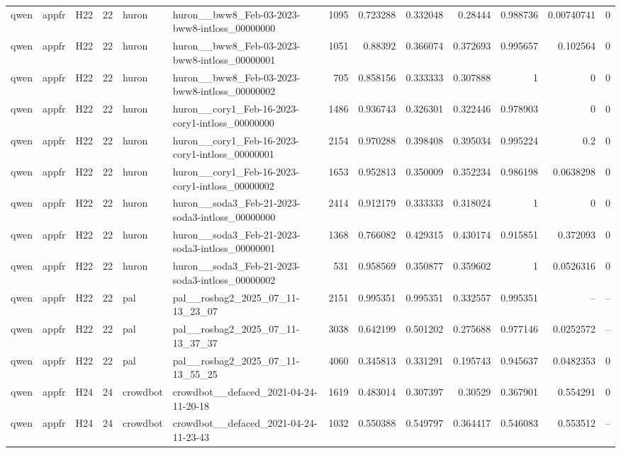 \begin{longtable}{lllrllrrrrrrr}
qwen & appfr & H22 & 22 & huron & huron\_\_bww8\_Feb-03-2023-bww8-intloss\_00000000 & 1095 & 0.723288 & 0.332048 & 0.28444 & 0.988736 & 0.00740741 & 0 \\
qwen & appfr & H22 & 22 & huron & huron\_\_bww8\_Feb-03-2023-bww8-intloss\_00000001 & 1051 & 0.88392 & 0.366074 & 0.372693 & 0.995657 & 0.102564 & 0 \\
qwen & appfr & H22 & 22 & huron & huron\_\_bww8\_Feb-03-2023-bww8-intloss\_00000002 & 705 & 0.858156 & 0.333333 & 0.307888 & 1 & 0 & 0 \\
qwen & appfr & H22 & 22 & huron & huron\_\_cory1\_Feb-16-2023-cory1-intloss\_00000000 & 1486 & 0.936743 & 0.326301 & 0.322446 & 0.978903 & 0 & 0 \\
qwen & appfr & H22 & 22 & huron & huron\_\_cory1\_Feb-16-2023-cory1-intloss\_00000001 & 2154 & 0.970288 & 0.398408 & 0.395034 & 0.995224 & 0.2 & 0 \\
qwen & appfr & H22 & 22 & huron & huron\_\_cory1\_Feb-16-2023-cory1-intloss\_00000002 & 1653 & 0.952813 & 0.350009 & 0.352234 & 0.986198 & 0.0638298 & 0 \\
qwen & appfr & H22 & 22 & huron & huron\_\_soda3\_Feb-21-2023-soda3-intloss\_00000000 & 2414 & 0.912179 & 0.333333 & 0.318024 & 1 & 0 & 0 \\
qwen & appfr & H22 & 22 & huron & huron\_\_soda3\_Feb-21-2023-soda3-intloss\_00000001 & 1368 & 0.766082 & 0.429315 & 0.430174 & 0.915851 & 0.372093 & 0 \\
qwen & appfr & H22 & 22 & huron & huron\_\_soda3\_Feb-21-2023-soda3-intloss\_00000002 & 531 & 0.958569 & 0.350877 & 0.359602 & 1 & 0.0526316 & 0 \\
qwen & appfr & H22 & 22 & pal & pal\_\_rosbag2\_2025\_07\_11-13\_23\_07 & 2151 & 0.995351 & 0.995351 & 0.332557 & 0.995351 & -- & -- \\
qwen & appfr & H22 & 22 & pal & pal\_\_rosbag2\_2025\_07\_11-13\_37\_37 & 3038 & 0.642199 & 0.501202 & 0.275688 & 0.977146 & 0.0252572 & -- \\
qwen & appfr & H22 & 22 & pal & pal\_\_rosbag2\_2025\_07\_11-13\_55\_25 & 4060 & 0.345813 & 0.331291 & 0.195743 & 0.945637 & 0.0482353 & 0 \\
qwen & appfr & H24 & 24 & crowdbot & crowdbot\_\_defaced\_2021-04-24-11-20-18 & 1619 & 0.483014 & 0.307397 & 0.30529 & 0.367901 & 0.554291 & 0 \\
qwen & appfr & H24 & 24 & crowdbot & crowdbot\_\_defaced\_2021-04-24-11-23-43 & 1032 & 0.550388 & 0.549797 & 0.364417 & 0.546083 & 0.553512 & -- \\

\end{longtable}
